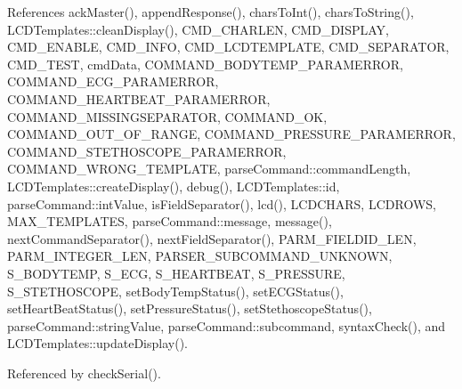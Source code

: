 \begin{DoxyCode}
\begin{DoxyCode}
\begin{DoxyCode}
References ack\-Master(), append\-Response(), chars\-To\-Int(), chars\-To\-String(), L\-C\-D\-Templates\-::clean\-Display(), C\-M\-D\-\_\-\-C\-H\-A\-R\-L\-E\-N, C\-M\-D\-\_\-\-D\-I\-S\-P\-L\-A\-Y, C\-M\-D\-\_\-\-E\-N\-A\-B\-L\-E, C\-M\-D\-\_\-\-I\-N\-F\-O, C\-M\-D\-\_\-\-L\-C\-D\-T\-E\-M\-P\-L\-A\-T\-E, C\-M\-D\-\_\-\-S\-E\-P\-A\-R\-A\-T\-O\-R, C\-M\-D\-\_\-\-T\-E\-S\-T, cmd\-Data, C\-O\-M\-M\-A\-N\-D\-\_\-\-B\-O\-D\-Y\-T\-E\-M\-P\-\_\-\-P\-A\-R\-A\-M\-E\-R\-R\-O\-R, C\-O\-M\-M\-A\-N\-D\-\_\-\-E\-C\-G\-\_\-\-P\-A\-R\-A\-M\-E\-R\-R\-O\-R, C\-O\-M\-M\-A\-N\-D\-\_\-\-H\-E\-A\-R\-T\-B\-E\-A\-T\-\_\-\-P\-A\-R\-A\-M\-E\-R\-R\-O\-R, C\-O\-M\-M\-A\-N\-D\-\_\-\-M\-I\-S\-S\-I\-N\-G\-S\-E\-P\-A\-R\-A\-T\-O\-R, C\-O\-M\-M\-A\-N\-D\-\_\-\-O\-K, C\-O\-M\-M\-A\-N\-D\-\_\-\-O\-U\-T\-\_\-\-O\-F\-\_\-\-R\-A\-N\-G\-E, C\-O\-M\-M\-A\-N\-D\-\_\-\-P\-R\-E\-S\-S\-U\-R\-E\-\_\-\-P\-A\-R\-A\-M\-E\-R\-R\-O\-R, C\-O\-M\-M\-A\-N\-D\-\_\-\-S\-T\-E\-T\-H\-O\-S\-C\-O\-P\-E\-\_\-\-P\-A\-R\-A\-M\-E\-R\-R\-O\-R, C\-O\-M\-M\-A\-N\-D\-\_\-\-W\-R\-O\-N\-G\-\_\-\-T\-E\-M\-P\-L\-A\-T\-E, parse\-Command\-::command\-Length, L\-C\-D\-Templates\-::create\-Display(), debug(), L\-C\-D\-Templates\-::id, parse\-Command\-::int\-Value, is\-Field\-Separator(), lcd(), L\-C\-D\-C\-H\-A\-R\-S, L\-C\-D\-R\-O\-W\-S, M\-A\-X\-\_\-\-T\-E\-M\-P\-L\-A\-T\-E\-S, parse\-Command\-::message, message(), next\-Command\-Separator(), next\-Field\-Separator(), P\-A\-R\-M\-\_\-\-F\-I\-E\-L\-D\-I\-D\-\_\-\-L\-E\-N, P\-A\-R\-M\-\_\-\-I\-N\-T\-E\-G\-E\-R\-\_\-\-L\-E\-N, P\-A\-R\-S\-E\-R\-\_\-\-S\-U\-B\-C\-O\-M\-M\-A\-N\-D\-\_\-\-U\-N\-K\-N\-O\-W\-N, S\-\_\-\-B\-O\-D\-Y\-T\-E\-M\-P, S\-\_\-\-E\-C\-G, S\-\_\-\-H\-E\-A\-R\-T\-B\-E\-A\-T, S\-\_\-\-P\-R\-E\-S\-S\-U\-R\-E, S\-\_\-\-S\-T\-E\-T\-H\-O\-S\-C\-O\-P\-E, set\-Body\-Temp\-Status(), set\-E\-C\-G\-Status(), set\-Heart\-Beat\-Status(), set\-Pressure\-Status(), set\-Stethoscope\-Status(), parse\-Command\-::string\-Value, parse\-Command\-::subcommand, syntax\-Check(), and L\-C\-D\-Templates\-::update\-Display().



Referenced by check\-Serial().



\end{DoxyCode}
\end{DoxyCode}
\end{DoxyCode}
